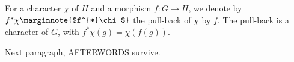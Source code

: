 \documentclass{article}
\newcommand{\pullbackChiByF}[2]{\pullbackSymbol{#2}#1}
\newcommand{\pullbackSymbol}[1]{#1^{*}}
\newcommand{\defineNotation}[1]{#1\marginnote{$#1$}}
\begin{document}
For a character $\chi$ of $H$ and a morphism ${f \colon G \to H}$, we denote by $\defineNotation{\pullbackChiByF{\chi}{f}}$ the pull-back of $\chi$ by $f$. The pull-back is a character of $G$, with $\pullbackChiByF{\chi}{f}(g) = \chi(f(g))$.

Next paragraph, AFTERWORDS survive.
\end{document}
